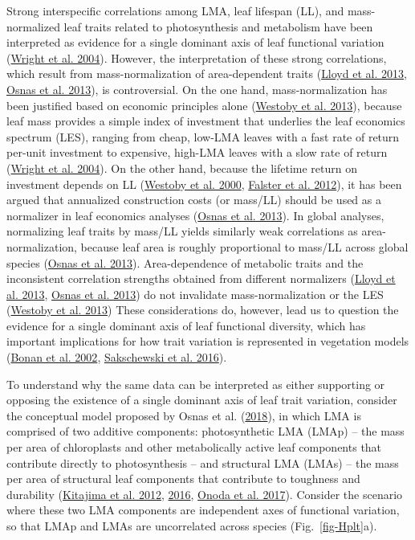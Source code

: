 \documentclass[
  12pt,
  a4paper,
,tablecaptionabove
]{scrartcl}
\begin{document}
Strong interspecific correlations among LMA, leaf lifespan (LL), and
mass-normalized leaf traits related to photosynthesis and metabolism
have been interpreted as evidence for a single dominant axis of leaf
functional variation (\protect\hyperlink{ref-Wright2004a}{Wright et al.
2004}). However, the interpretation of these strong correlations, which
result from mass-normalization of area-dependent traits
(\protect\hyperlink{ref-Lloyd2013}{Lloyd et al. 2013},
\protect\hyperlink{ref-Osnas2013}{Osnas et al. 2013}), is controversial.
On the one hand, mass-normalization has been justified based on economic
principles alone (\protect\hyperlink{ref-Westoby2013}{Westoby et al.
2013}), because leaf mass provides a simple index of investment that
underlies the leaf economics spectrum (LES), ranging from cheap, low-LMA
leaves with a fast rate of return per-unit investment to expensive,
high-LMA leaves with a slow rate of return
(\protect\hyperlink{ref-Wright2004a}{Wright et al. 2004}). On the other
hand, because the lifetime return on investment depends on LL
(\protect\hyperlink{ref-Westoby2000}{Westoby et al. 2000},
\protect\hyperlink{ref-Falster2012}{Falster et al. 2012}), it has been
argued that annualized construction costs (or mass/LL) should be used as
a normalizer in leaf economics analyses
(\protect\hyperlink{ref-Osnas2013}{Osnas et al. 2013}). In global
analyses, normalizing leaf traits by mass/LL yields similarly weak
correlations as area-normalization, because leaf area is roughly
proportional to mass/LL across global species
(\protect\hyperlink{ref-Osnas2013}{Osnas et al. 2013}). Area-dependence
of metabolic traits and the inconsistent correlation strengths obtained
from different normalizers (\protect\hyperlink{ref-Lloyd2013}{Lloyd et
al. 2013}, \protect\hyperlink{ref-Osnas2013}{Osnas et al. 2013}) do not
invalidate mass-normalization or the LES
(\protect\hyperlink{ref-Westoby2013}{Westoby et al. 2013}) These
considerations do, however, lead us to question the evidence for a
single dominant axis of leaf functional diversity, which has important
implications for how trait variation is represented in vegetation models
(\protect\hyperlink{ref-Bonan2002}{Bonan et al. 2002},
\protect\hyperlink{ref-Sakschewski2016}{Sakschewski et al. 2016}).

To understand why the same data can be interpreted as either supporting
or opposing the existence of a single dominant axis of leaf trait
variation, consider the conceptual model proposed by Osnas et al.
(\protect\hyperlink{ref-Osnas2018}{2018}), in which LMA is comprised of
two additive components: photosynthetic LMA (LMAp) -- the mass per area
of chloroplasts and other metabolically active leaf components that
contribute directly to photosynthesis -- and structural LMA (LMAs) --
the mass per area of structural leaf components that contribute to
toughness and durability (\protect\hyperlink{ref-Kitajima2012}{Kitajima
et al. 2012}, \protect\hyperlink{ref-Kitajima2016}{2016},
\protect\hyperlink{ref-Onoda2017}{Onoda et al. 2017}). Consider the
scenario where these two LMA components are independent axes of
functional variation, so that LMAp and LMAs are uncorrelated across
species (Fig.~\ref{fig-Hplt}a).
\end{document}
